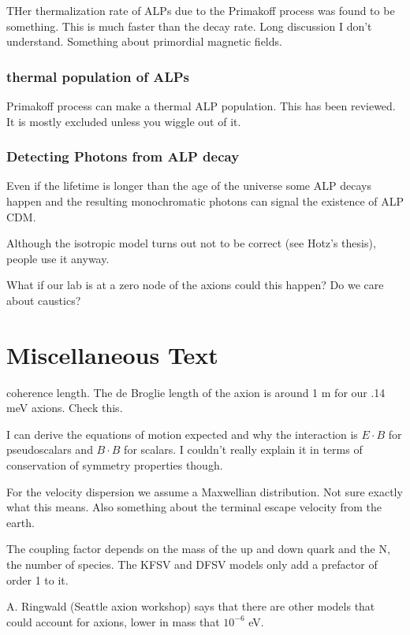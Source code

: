\documentclass[12pt, twoside]{book}
\begin{document}
THer thermalization rate of ALPs due to the Primakoff process was found to be something. This is much faster than the decay rate. Long discussion I don't understand. Something about primordial magnetic fields.

\subsubsection{thermal population of ALPs}

Primakoff process can make a thermal ALP population. This has been reviewed. It is mostly excluded unless you wiggle out of it.

\subsubsection{Detecting Photons from ALP decay}

Even if the lifetime is longer than the age of the universe some ALP decays happen and the resulting monochromatic photons can signal the existence of ALP CDM.

Although the isotropic model turns out not to be correct (see Hotz's thesis), people use it anyway.

What if our lab is at a zero node of the axions could this happen? Do we care about caustics?

\section{Miscellaneous Text}

coherence length. The de Broglie length of the axion is around 1 m for our .14 meV axions. Check this.

I can derive the equations of motion expected and why the interaction is $E\cdot B$ for pseudoscalars and $B\cdot B$ for scalars. I couldn't really explain it in terms of conservation of symmetry properties though.

For the velocity dispersion we assume a Maxwellian distribution. Not sure exactly what this means. Also something about the terminal escape velocity from the earth.


The coupling factor depends on the mass of the up and down quark and the N, the number of species. The KFSV and DFSV models only add a prefactor of order 1 to it.

A. Ringwald (Seattle axion workshop) says that there are other models that could account for axions, lower in mass that $10^{-6}$ eV.
\end{document}
